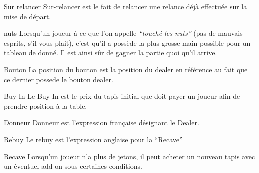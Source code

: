 \begin{df}{Sur relancer}
	Sur-relancer est le fait de relancer une relance déjà effectuée sur la mise de départ.
\end{df}

\begin{df}{nuts}
	Lorsqu'un joueur à ce que l'on appelle \textit{``touché les nuts''} (pas de mauvais esprits, s'il vous plait), c'est qu'il a possède la plus grosse main possible pour un tableau de donné. Il est ainsi sûr de gagner la partie quoi qu'il arrive.
\end{df}

\begin{df}{Bouton}
	La position du bouton est la position du dealer en référence au fait que ce dernier possede le bouton dealer.
\end{df}

\begin{df}{Buy-In}
	Le Buy-In est le prix du tapis initial que doit payer un joueur afin de prendre position à la table.
\end{df}

\begin{df}{Donneur}
	Donneur est l'expression française désignant le Dealer.
\end{df}

\begin{df}{Rebuy}
	Le rebuy est l'expression anglaise pour la ``Recave''
\end{df}

\begin{df}{Recave}
	Lorsqu'un joueur n'a plus de jetons, il peut acheter un nouveau tapis avec un éventuel add-on sous certaines conditions.
\end{df}